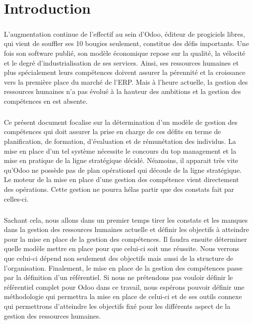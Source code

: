 \chapter*{Introduction}
\paragraph{}L’augmentation continue de l’effectif au sein d’Odoo, éditeur de progiciels libres, qui vient de souffler ses 10 bougies seulement, constitue des défis importants. Une fois son software publié, son modèle économique repose sur la qualité, la vélocité et le degré d’industrialisation de ses services. Ainsi, ses ressources humaines et plus spécialement leurs compétences doivent assurer la pérennité et la croissance vers la première place du marché de l'ERP. Mais à l'heure actuelle, la gestion des ressources humaines n'a pas évolué à la hauteur des ambitions et la gestion des compétences en est absente. 

\paragraph{}Ce présent document focalise sur la détermination d'un modèle de gestion des compétences qui doit assurer la prise en charge de ces défits en terme de planification, de formation, d'évaluation et de rémunétation des individus. La mise en place d'un tel système nécessite le concours du top management et la mise en pratique de la ligne stratégique décidé. Néamoins, il apparait très vite qu'Odoo ne possède pas de plan opérationel qui découle de la ligne stratégique. Le moteur de la mise en place d'une gestion des compétence vient directement des opérations. Cette gestion ne pourra hélas partir que des constats fait par celles-ci. 

\paragraph{}Sachant cela, nous allons dans un premier temps tirer les constats et les manques dans la gestion des ressources humaines actuelle et définir les objectifs à atteindre pour la mise en place de la gestion des compétences. Il faudra ensuite déterminer quelle modèle mettre en place pour que celui-ci soit une réussite. Nous verrons que celui-ci dépend non seulement des objectifs mais aussi de la structure de l'organisation. Finalement, le mise en place de la gestion des compétences passe par la définition d'un référentiel. Si nous ne prétendons pas vouloir définir le référentiel complet pour Odoo dans ce travail, nous espérons pouvoir définir une méthodologie qui permettra la mise en place de celui-ci et de ses outils connexe qui permettrons d'atteindre les objectifs fixé pour les différents aspect de la gestion des ressources humaines. 
